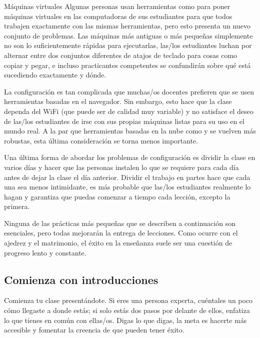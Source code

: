 \begin{aside}{Máquinas virtuales}
  Algunas personas usan herramientas como 
  para poner máquinas virtuales en las computadoras de sus estudiantes
  para que todos trabajen exactamente con las mismas herramientas,
  pero esto presenta un nuevo conjunto de problemas.
  Las máquinas más antiguas o más pequeñas simplemente no son lo suficientemente rápidas para ejecutarlas,
  las/los estudiantes luchan por alternar
  entre dos conjuntos diferentes de atajos de teclado para cosas como copiar y pegar,
  e incluso practicantes competentes se confundirán sobre qué está sucediendo exactamente y dónde.
\end{aside}

La configuración es tan complicada que
muchas/os docentes prefieren que se usen herramientas basadas en el navegador.
Sin embargo,
esto hace que la clase dependa del WiFi
(que puede ser de calidad muy variable)
y no satisface el deseo de las/los estudiantes de irse con sus propias máquinas listas para su uso en el mundo real.
A la par que herramientas basadas en la nube como 
y  se vuelven más robustas,
esta última consideración se torna menos importante.

Una última forma de abordar los problemas de configuración es dividir la clase en varios días
y hacer que las personas instalen lo que se requiere para cada día
antes de dejar la clase el día anterior.
Dividir el trabajo en partes hace que cada una sea menos intimidante,
es más probable que las/los estudiantes realmente lo hagan
y garantiza que puedas comenzar a tiempo cada lección, excepto la primera.


Ninguna de las prácticas más pequeñas que se describen a continuación son esenciales,
pero todas mejorarán la entrega de lecciones.
Como ocurre con el ajedrez y el matrimonio,
el éxito en la enseñanza suele ser una cuestión de progreso lento y constante.

\subsection*{Comienza con introducciones}

Comienza tu clase presentándote.
Si eres una persona experta,
cuéntales un poco cómo llegaste a donde estás;
si solo estás dos pasos por delante de ellos,
enfatiza lo que tienes en común con ellas/os.
Digas lo que digas,
la meta es hacerte más accesible
y fomentar la creencia de que pueden tener éxito.

